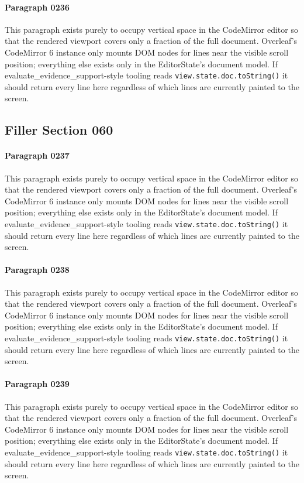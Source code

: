 \documentclass{article}
\begin{document}
\paragraph{Paragraph 0236}
This paragraph exists purely to occupy vertical space in the CodeMirror editor so that the rendered viewport covers only a fraction of the full document. Overleaf's CodeMirror 6 instance only mounts DOM nodes for lines near the visible scroll position; everything else exists only in the EditorState's document model. If evaluate\_evidence\_support-style tooling reads \texttt{view.state.doc.toString()} it should return every line here regardless of which lines are currently painted to the screen.

\subsection{Filler Section 060}
\paragraph{Paragraph 0237}
This paragraph exists purely to occupy vertical space in the CodeMirror editor so that the rendered viewport covers only a fraction of the full document. Overleaf's CodeMirror 6 instance only mounts DOM nodes for lines near the visible scroll position; everything else exists only in the EditorState's document model. If evaluate\_evidence\_support-style tooling reads \texttt{view.state.doc.toString()} it should return every line here regardless of which lines are currently painted to the screen.

\paragraph{Paragraph 0238}
This paragraph exists purely to occupy vertical space in the CodeMirror editor so that the rendered viewport covers only a fraction of the full document. Overleaf's CodeMirror 6 instance only mounts DOM nodes for lines near the visible scroll position; everything else exists only in the EditorState's document model. If evaluate\_evidence\_support-style tooling reads \texttt{view.state.doc.toString()} it should return every line here regardless of which lines are currently painted to the screen.

\paragraph{Paragraph 0239}
This paragraph exists purely to occupy vertical space in the CodeMirror editor so that the rendered viewport covers only a fraction of the full document. Overleaf's CodeMirror 6 instance only mounts DOM nodes for lines near the visible scroll position; everything else exists only in the EditorState's document model. If evaluate\_evidence\_support-style tooling reads \texttt{view.state.doc.toString()} it should return every line here regardless of which lines are currently painted to the screen.
\end{document}
